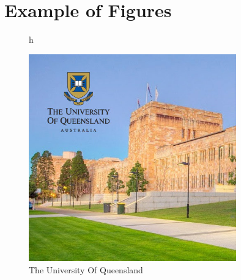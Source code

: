 \chapter{Example of Figures}

\begin{figure}{h}
\begin{center}
\includegraphics[width=0.8\textwidth]{Examples/FigureUQ}
\caption{The University Of Queensland}
\label{Fig:1}
\end{center}
\end{figure}